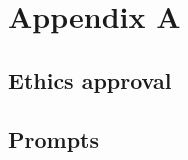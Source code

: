 \chapter{Appendix A}\label{appendixA}

\minitoc

\section{Ethics approval}

\label{appendix:ethics}

\section{Prompts}

\label{appendix:prompt-traits}

